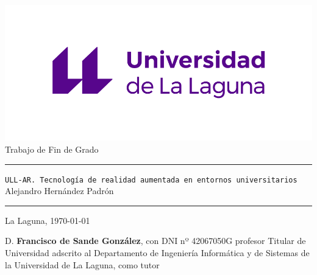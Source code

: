 \documentclass[spanish,a4paper,12pt,oneside]{extreport}
\newcommand{\BulletP}{\texttt{ULL-AR.{ Tecnología de realidad aumentada en entornos universitarios}}}
\begin{document}
\renewcommand{\lstlistingname}{Listado}%

\pagestyle{empty}
\thispagestyle{empty}


\newcommand{\HRule}{\rule{\linewidth}{1mm}}
\setlength{\parindent}{0mm}
\setlength{\parskip}{0mm}


\begin{center}
\includegraphics[scale=1.1]{images/marca-universidad-de-la-laguna-original}\\[15mm]
{\Huge Trabajo de Fin de Grado}
\end{center}

\HRule
\begin{flushright}
        {\Huge \BulletP{}} \\[2.5mm]
        {\Large Alejandro Hernández Padrón} \\[5mm]


\end{flushright}
\HRule
{}
\begin{center}
  \Large La Laguna, \today
\end{center}

\setlength{\parindent}{5mm}

\newpage
\thispagestyle{empty}

D. {\bf Francisco de Sande González}, con DNI nº 42067050G
profesor
Titular de Universidad
adscrito al Departamento
de Ingeniería Informática y de Sistemas
de la Universidad de La Laguna, como tutor
\end{document}
